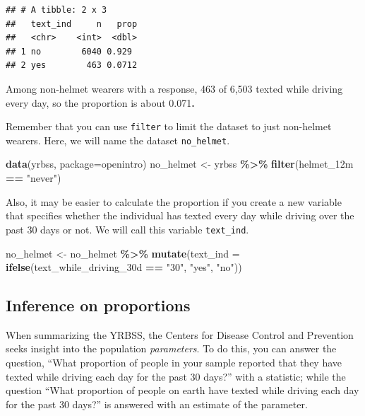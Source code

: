 \documentclass[
]{article}
\newenvironment{Shaded}{\begin{snugshade}}{\end{snugshade}}
\newcommand{\AttributeTok}[1]{\textcolor[rgb]{0.13,0.29,0.53}{#1}}
\newcommand{\FunctionTok}[1]{\textcolor[rgb]{0.13,0.29,0.53}{\textbf{#1}}}
\newcommand{\NormalTok}[1]{#1}
\newcommand{\OtherTok}[1]{\textcolor[rgb]{0.56,0.35,0.01}{#1}}
\newcommand{\SpecialCharTok}[1]{\textcolor[rgb]{0.81,0.36,0.00}{\textbf{#1}}}
\newcommand{\StringTok}[1]{\textcolor[rgb]{0.31,0.60,0.02}{#1}}
\begin{document}
\begin{verbatim}
## # A tibble: 2 x 3
##   text_ind     n   prop
##   <chr>    <int>  <dbl>
## 1 no        6040 0.929 
## 2 yes        463 0.0712
\end{verbatim}

Among non-helmet wearers with a response, 463 of 6,503 texted while
driving every day, so the proportion is about 0.071\textbf{.}

Remember that you can use \texttt{filter} to limit the dataset to just
non-helmet wearers. Here, we will name the dataset \texttt{no\_helmet}.

\begin{Shaded}
\begin{Highlighting}[]
\FunctionTok{data}\NormalTok{(}\StringTok{\textquotesingle{}yrbss\textquotesingle{}}\NormalTok{, }\AttributeTok{package=}\StringTok{\textquotesingle{}openintro\textquotesingle{}}\NormalTok{)}
\NormalTok{no\_helmet }\OtherTok{\textless{}{-}}\NormalTok{ yrbss }\SpecialCharTok{\%\textgreater{}\%}
  \FunctionTok{filter}\NormalTok{(helmet\_12m }\SpecialCharTok{==} \StringTok{"never"}\NormalTok{)}
\end{Highlighting}
\end{Shaded}

Also, it may be easier to calculate the proportion if you create a new
variable that specifies whether the individual has texted every day
while driving over the past 30 days or not. We will call this variable
\texttt{text\_ind}.

\begin{Shaded}
\begin{Highlighting}[]
\NormalTok{no\_helmet }\OtherTok{\textless{}{-}}\NormalTok{ no\_helmet }\SpecialCharTok{\%\textgreater{}\%}
  \FunctionTok{mutate}\NormalTok{(}\AttributeTok{text\_ind =} \FunctionTok{ifelse}\NormalTok{(text\_while\_driving\_30d }\SpecialCharTok{==} \StringTok{"30"}\NormalTok{, }\StringTok{"yes"}\NormalTok{, }\StringTok{"no"}\NormalTok{))}
\end{Highlighting}
\end{Shaded}

\subsection{Inference on proportions}\label{inference-on-proportions}

When summarizing the YRBSS, the Centers for Disease Control and
Prevention seeks insight into the population \emph{parameters}. To do
this, you can answer the question, ``What proportion of people in your
sample reported that they have texted while driving each day for the
past 30 days?'' with a statistic; while the question ``What proportion
of people on earth have texted while driving each day for the past 30
days?'' is answered with an estimate of the parameter.
\end{document}
